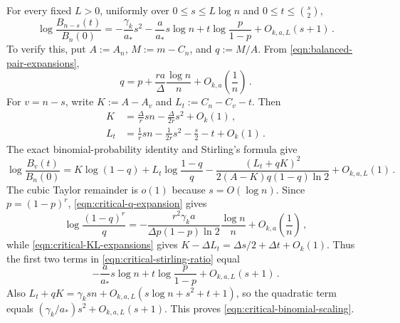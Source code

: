 For every fixed $L>0$, uniformly over $0\leq s\leq L\log n$ and $0\leq t\leq\binom s2$,
\begin{equation}\label{eqn:critical-binomial-scaling}
\log\frac{B_{n-s}(t)}{B_n(0)}=-\frac{\gamma_k}{a_\ast}s^2-\frac{a}{a_\ast}s\log n+t\log\frac{p}{1-p}+O_{k,a,L}(s+1)\,.
\end{equation}
To verify this, put $A:=A_n$, $M:=m-C_n$, and $q:=M/A$. From \eqref{eqn:balanced-pair-expansions},
\begin{equation}\label{eqn:critical-q-expansion}
q=p+\frac{ra}{\Delta}\frac{\log n}{n}+O_{k,a}\!\left(\frac1n\right)\,.
\end{equation}
For $v=n-s$, write $K:=A-A_v$ and $L_t:=C_n-C_v-t$. Then
\begin{align}
K&=\frac{\Delta}{r}sn-\frac{\Delta}{2r}s^2+O_k(1)\,,\nonumber\\
L_t&=\frac1r sn-\frac1{2r}s^2-\frac s2-t+O_k(1)\,.\label{eqn:critical-KL-expansions}
\end{align}
The exact binomial-probability identity and Stirling's formula give
\begin{equation}\label{eqn:critical-stirling-ratio}
\log\frac{B_v(t)}{B_n(0)}=K\log(1-q)+L_t\log\frac{1-q}{q}-\frac{(L_t+qK)^2}{2(A-K)q(1-q)\ln2}+O_{k,a,L}(1)\,.
\end{equation}
The cubic Taylor remainder is $o(1)$ because $s=O(\log n)$. Since $p=(1-p)^r$, \eqref{eqn:critical-q-expansion} gives
$$\log\frac{(1-q)^r}{q}=-\frac{r^2\gamma_ka}{\Delta p(1-p)\ln2}\frac{\log n}{n}+O_{k,a}\!\left(\frac1n\right)\,,$$
while \eqref{eqn:critical-KL-expansions} gives $K-\Delta L_t=\Delta s/2+\Delta t+O_k(1)$. Thus the first two terms in \eqref{eqn:critical-stirling-ratio} equal
$$-\frac{a}{a_\ast}s\log n+t\log\frac{p}{1-p}+O_{k,a,L}(s+1)\,.$$
Also $L_t+qK=\gamma_ksn+O_{k,a,L}(s\log n+s^2+t+1)$, so the quadratic term equals $(\gamma_k/a_\ast)s^2+O_{k,a,L}(s+1)$. This proves \eqref{eqn:critical-binomial-scaling}.

